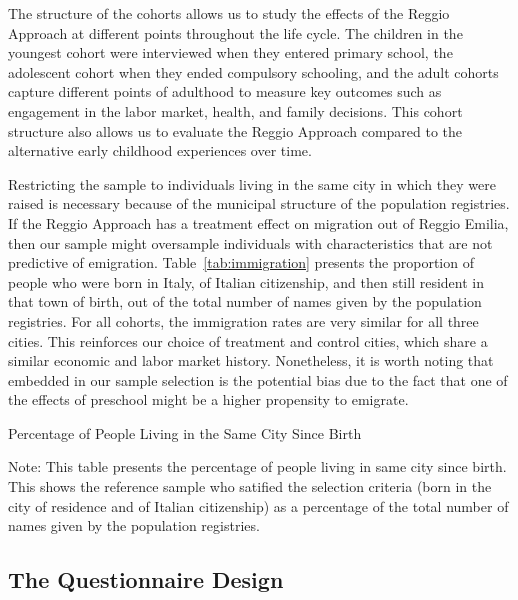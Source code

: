 The structure of the cohorts allows us to study the effects of the Reggio Approach at different points throughout the life cycle. The children in the youngest cohort were interviewed when they entered primary school, the adolescent cohort when they ended compulsory schooling, and the adult cohorts capture different points of adulthood to measure key outcomes such as engagement in the labor market, health, and family decisions. This cohort structure also allows us to evaluate the Reggio Approach compared to the alternative early childhood experiences over time.

Restricting the sample to individuals living in the same city in which they were raised is necessary because of the municipal structure of the population registries. If the Reggio Approach has a treatment effect on migration out of Reggio Emilia, then our sample might oversample individuals with characteristics that are not predictive of emigration. Table~\ref{tab:immigration} presents the proportion of people who were born in Italy, of Italian citizenship, and then still resident in that town of birth, out of the total number of names given by the population registries. For all cohorts, the immigration rates are very similar for all three cities. This reinforces our choice of treatment and control cities, which share a similar economic and labor market history. Nonetheless, it is worth noting that embedded in our sample selection is the potential bias due to the fact that one of the effects of preschool might be a higher propensity to emigrate. 

\begin{table}[H]
\centering
\begin{threeparttable}
	\caption{Percentage of People Living in the Same City Since Birth}\label{tab:immigration}
	
\begin{tablenotes}
\footnotesize
Note: This table presents the percentage of people living in same city since birth. This  shows the reference sample who satified the selection criteria (born in the city of residence and of Italian citizenship) as a percentage of the total number of names given by the population registries.
\end{tablenotes}
\end{threeparttable}
\end{table}

\subsection{The Questionnaire Design}

